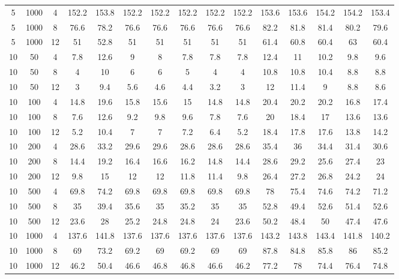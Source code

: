 \documentclass[review,3p,times,authoryear,12pt]{elsarticle}
\begin{document}
\begin{table}[htbp]
\begin{tabular}{ccccccccccccccc}
    5     & 1000  & 4     & 152.2 & 153.8 & 152.2 & 152.2 & 152.2 & 152.2 & 152.2 & 153.6 & 153.6 & 154.2 & 154.2 & 153.4 \\
    5     & 1000  & 8     & 76.6  & 78.2  & 76.6  & 76.6  & 76.6  & 76.6  & 76.6  & 82.2  & 81.8  & 81.4  & 80.2  & 79.6 \\
    5     & 1000  & 12    & 51    & 52.8  & 51    & 51    & 51    & 51    & 51    & 61.4  & 60.8  & 60.4  & 63    & 60.4 \\
    10    & 50    & 4     & 7.8   & 12.6  & 9     & 8     & 7.8   & 7.8   & 7.8   & 12.4  & 11    & 10.2  & 9.8   & 9.6 \\
    10    & 50    & 8     & 4     & 10    & 6     & 6     & 5     & 4     & 4     & 10.8  & 10.8  & 10.4  & 8.8   & 8.8 \\
    10    & 50    & 12    & 3     & 9.4   & 5.6   & 4.6   & 4.4   & 3.2   & 3     & 12    & 11.4  & 9     & 8.8   & 8.6 \\
    10    & 100   & 4     & 14.8  & 19.6  & 15.8  & 15.6  & 15    & 14.8  & 14.8  & 20.4  & 20.2  & 20.2  & 16.8  & 17.4 \\
    10    & 100   & 8     & 7.6   & 12.6  & 9.2   & 9.8   & 9.6   & 7.8   & 7.6   & 20    & 18.4  & 17    & 13.6  & 13.6 \\
    10    & 100   & 12    & 5.2   & 10.4  & 7     & 7     & 7.2   & 6.4   & 5.2   & 18.4  & 17.8  & 17.6  & 13.8  & 14.2 \\
    10    & 200   & 4     & 28.6  & 33.2  & 29.6  & 29.6  & 28.6  & 28.6  & 28.6  & 35.4  & 36    & 34.4  & 31.4  & 30.6 \\
    10    & 200   & 8     & 14.4  & 19.2  & 16.4  & 16.6  & 16.2  & 14.8  & 14.4  & 28.6  & 29.2  & 25.6  & 27.4  & 23 \\
    10    & 200   & 12    & 9.8   & 15    & 12    & 12    & 11.8  & 11.4  & 9.8   & 26.4  & 27.2  & 26.8  & 24.2  & 24 \\
    10    & 500   & 4     & 69.8  & 74.2  & 69.8  & 69.8  & 69.8  & 69.8  & 69.8  & 78    & 75.4  & 74.6  & 74.2  & 71.2 \\
    10    & 500   & 8     & 35    & 39.4  & 35.6  & 35    & 35.2  & 35    & 35    & 52.8  & 49.4  & 52.6  & 51.4  & 52.6 \\
    10    & 500   & 12    & 23.6  & 28    & 25.2  & 24.8  & 24.8  & 24    & 23.6  & 50.2  & 48.4  & 50    & 47.4  & 47.6 \\
    10    & 1000  & 4     & 137.6 & 141.8 & 137.6 & 137.6 & 137.6 & 137.6 & 137.6 & 143.2 & 143.8 & 143.4 & 141.8 & 140.2 \\
    10    & 1000  & 8     & 69    & 73.2  & 69.2  & 69    & 69.2  & 69    & 69    & 87.8  & 84.8  & 85.8  & 86    & 85.2 \\
    10    & 1000  & 12    & 46.2  & 50.4  & 46.6  & 46.8  & 46.8  & 46.6  & 46.2  & 77.2  & 78    & 74.4  & 76.4  & 74.8 \\

    \hline
    \end{tabular}
  \label{tab:2}
\end{table}
\end{document}
